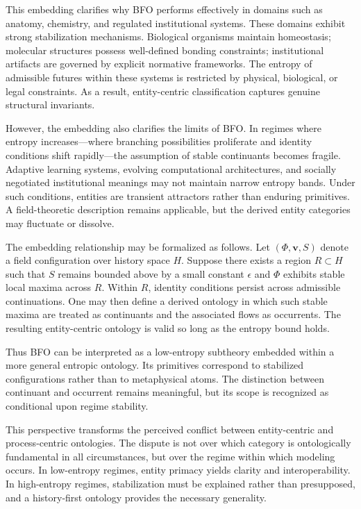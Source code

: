 \documentclass[12pt]{article}
\begin{document}
This embedding clarifies why BFO performs effectively in domains such as anatomy, chemistry, and regulated institutional systems. These domains exhibit strong stabilization mechanisms. Biological organisms maintain homeostasis; molecular structures possess well-defined bonding constraints; institutional artifacts are governed by explicit normative frameworks. The entropy of admissible futures within these systems is restricted by physical, biological, or legal constraints. As a result, entity-centric classification captures genuine structural invariants.

However, the embedding also clarifies the limits of BFO. In regimes where entropy increases—where branching possibilities proliferate and identity conditions shift rapidly—the assumption of stable continuants becomes fragile. Adaptive learning systems, evolving computational architectures, and socially negotiated institutional meanings may not maintain narrow entropy bands. Under such conditions, entities are transient attractors rather than enduring primitives. A field-theoretic description remains applicable, but the derived entity categories may fluctuate or dissolve.

The embedding relationship may be formalized as follows. Let $(\Phi, \mathbf{v}, S)$ denote a field configuration over history space $H$. Suppose there exists a region $R \subset H$ such that $S$ remains bounded above by a small constant $\epsilon$ and $\Phi$ exhibits stable local maxima across $R$. Within $R$, identity conditions persist across admissible continuations. One may then define a derived ontology in which such stable maxima are treated as continuants and the associated flows as occurrents. The resulting entity-centric ontology is valid so long as the entropy bound holds.

Thus BFO can be interpreted as a low-entropy subtheory embedded within a more general entropic ontology. Its primitives correspond to stabilized configurations rather than to metaphysical atoms. The distinction between continuant and occurrent remains meaningful, but its scope is recognized as conditional upon regime stability.

This perspective transforms the perceived conflict between entity-centric and process-centric ontologies. The dispute is not over which category is ontologically fundamental in all circumstances, but over the regime within which modeling occurs. In low-entropy regimes, entity primacy yields clarity and interoperability. In high-entropy regimes, stabilization must be explained rather than presupposed, and a history-first ontology provides the necessary generality.
\end{document}
